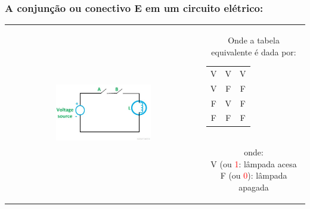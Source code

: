 \documentclass{beamer}
\begin{document}
\begin{frame}
\frametitle{A \textbf{conjunção} ou conectivo \textbf{E}  em um circuito elétrico:}

\begin{tabular}{c||c}  
 
 \includegraphics[height=0.5\textheight,width=0.5\textwidth]{figuras/circuito_AND.jpg} 
 
  &
  \parbox{0.4\linewidth}{\vspace{-4cm} Onde a tabela equivalente é dada por:\\
  	\begin{tabular}{|c|c|c|}
	\hline
	$\mathbf{A}$ & $\mathbf{B}$ & $\mathbf{A \wedge B}$ \\
	\hline
	V & V & V \\
	\hline
	V & F & F \\
	\hline
	F & V & F \\
	\hline
	F & F & F \\
	\hline
	\end{tabular}\\
  onde:\\
	V (ou  \textcolor{red}{1}: lâmpada acesa\\
	F (ou \textcolor{red}{0}): lâmpada apagada\\

  } %

\end{tabular} 	

\end{frame}
\end{document}
